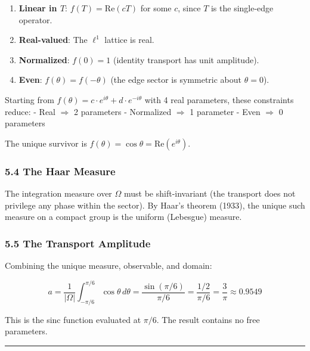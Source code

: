 \documentclass[
]{article}
\providecommand{\tightlist}{%
  \setlength{\itemsep}{0pt}\setlength{\parskip}{0pt}}
\begin{document}
\begin{enumerate}
\def\labelenumi{\arabic{enumi}.}
\tightlist
\item
  \textbf{Linear in \(T\)}: \(f(T) = \mathrm{Re}(cT)\) for some \(c\),
  since \(T\) is the single-edge operator.
\item
  \textbf{Real-valued}: The \(\ell^1\) lattice is real.
\item
  \textbf{Normalized}: \(f(0) = 1\) (identity transport has unit
  amplitude).
\item
  \textbf{Even}: \(f(\theta) = f(-\theta)\) (the edge sector is
  symmetric about \(\theta = 0\)).
\end{enumerate}

Starting from \(f(\theta) = c \cdot e^{i\theta} + d \cdot e^{-i\theta}\)
with 4 real parameters, these constraints reduce: - Real \(\Rightarrow\)
2 parameters - Normalized \(\Rightarrow\) 1 parameter - Even
\(\Rightarrow\) 0 parameters

The unique survivor is
\(f(\theta) = \cos\theta = \mathrm{Re}(e^{i\theta})\).

\hypertarget{the-haar-measure}{%
\subsubsection{5.4 The Haar Measure}\label{the-haar-measure}}

The integration measure over \(\Omega\) must be shift-invariant (the
transport does not privilege any phase within the sector). By Haar's
theorem (1933), the unique such measure on a compact group is the
uniform (Lebesgue) measure.

\hypertarget{the-transport-amplitude}{%
\subsubsection{5.5 The Transport
Amplitude}\label{the-transport-amplitude}}

Combining the unique measure, observable, and domain:

\[a = \frac{1}{|\Omega|} \int_{-\pi/6}^{\pi/6} \cos\theta \, d\theta = \frac{\sin(\pi/6)}{\pi/6} = \frac{1/2}{\pi/6} = \frac{3}{\pi} \approx 0.9549\]

This is the sinc function evaluated at \(\pi/6\). The result contains no
free parameters.

\begin{center}\rule{0.5\linewidth}{0.5pt}\end{center}
\end{document}
